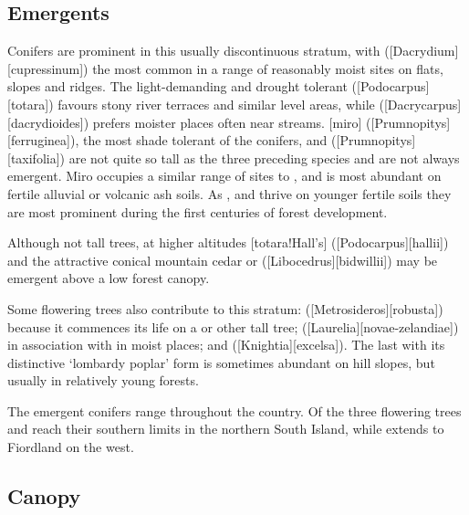 \subsection{Emergents}

Conifers are prominent in this usually discontinuous stratum, with  ([Dacrydium][cupressinum]) the most common in a range of reasonably moist sites on flats, slopes and ridges.
The light-demanding and drought tolerant  ([Podocarpus][totara]) favours stony river terraces and similar level areas, while  ([Dacrycarpus][dacrydioides]) prefers moister places often near streams.
[miro] ([Prumnopitys][ferruginea]), the most shade tolerant of the conifers, and  ([Prumnopitys][taxifolia]) are not quite so tall as the three preceding species and are not always emergent.
Miro occupies a similar range of sites to , and  is most abundant on fertile alluvial or volcanic ash soils.
As ,  and  thrive on younger fertile soils they are most prominent during the first centuries of forest development.

Although not tall trees, at higher altitudes [totara!Hall's] ([Podocarpus][hallii]) and the attractive conical mountain cedar or  ([Libocedrus][bidwillii]) may be emergent above a low forest canopy.

Some flowering trees also contribute to this stratum:  ([Metrosideros][robusta]) because it commences its life on a  or other tall tree;  ([Laurelia][novae-zelandiae]) in association with  in moist places; and  ([Knightia][excelsa]).
The last with its distinctive `lombardy poplar' form is sometimes abundant on hill slopes, but usually in relatively young forests.

The emergent conifers range throughout the country.
Of the three flowering trees  and  reach their southern limits in the northern South Island, while  extends to Fiordland on the west.

\subsection{Canopy}

